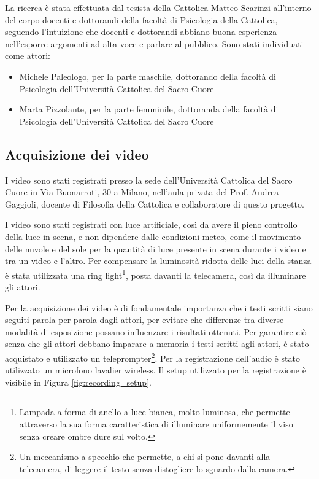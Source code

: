 La ricerca è stata effettuata dal tesista della Cattolica Matteo Scarinzi all'interno del corpo docenti e dottorandi della facoltà di Psicologia della Cattolica, seguendo l'intuizione che docenti e dottorandi abbiano buona esperienza nell'esporre argomenti ad alta voce e parlare al pubblico. Sono stati individuati come attori:
\begin{itemize}
    \item Michele Paleologo, per la parte maschile, dottorando della facoltà di Psicologia dell'Università Cattolica del Sacro Cuore
    \item Marta Pizzolante, per la parte femminile, dottoranda della facoltà di Psicologia dell'Università Cattolica del Sacro Cuore
\end{itemize}

\subsection{Acquisizione dei video}

I video sono stati registrati presso la sede dell'Università Cattolica del Sacro Cuore in Via Buonarroti, 30 a Milano, nell'aula privata del Prof. Andrea Gaggioli, docente di Filosofia della Cattolica e collaboratore di questo progetto.

I video sono stati registrati con luce artificiale, così da avere il pieno controllo della luce in scena, e non dipendere dalle condizioni meteo, come il movimento delle nuvole e del sole per la quantità di luce presente in scena durante i video e tra un video e l'altro. Per compensare la luminosità ridotta delle luci della stanza è stata utilizzata una ring light\footnote{Lampada a forma di anello a luce bianca, molto luminosa, che permette attraverso la sua forma caratteristica di illuminare uniformemente il viso senza creare ombre dure sul volto.}, posta davanti la telecamera, così da illuminare gli attori.

Per la acquisizione dei video è di fondamentale importanza che i testi scritti siano seguiti parola per parola dagli attori, per evitare che differenze tra diverse modalità di esposizione possano influenzare i risultati ottenuti. Per garantire ciò senza che gli attori debbano imparare a memoria i testi scritti agli attori, è stato acquistato e utilizzato un teleprompter\footnote{Un meccanismo a specchio che permette, a chi si pone davanti alla telecamera, di leggere il testo senza distogliere lo sguardo dalla camera.}. Per la registrazione dell'audio è stato utilizzato un microfono lavalier wireless. Il setup utilizzato per la registrazione è visibile in Figura \ref{fig:recording_setup}.

